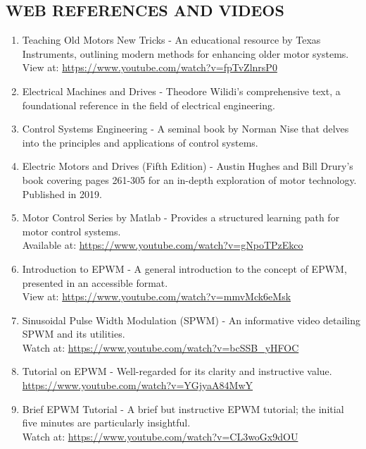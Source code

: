 \subsection*{WEB REFERENCES AND VIDEOS}



\begin{enumerate}
    \item Teaching Old Motors New Tricks - An educational resource by Texas Instruments, outlining modern methods for enhancing older motor systems.\\
    View at: \url{https://www.youtube.com/watch?v=fpTvZlnrsP0}
    
    \item Electrical Machines and Drives - Theodore Wilidi's comprehensive text, a foundational reference in the field of electrical engineering.
    
    \item Control Systems Engineering - A seminal book by Norman Nise that delves into the principles and applications of control systems.
    
    \item Electric Motors and Drives (Fifth Edition) - Austin Hughes and Bill Drury’s book covering pages 261-305 for an in-depth exploration of motor technology. Published in 2019.
    
    \item Motor Control Series by Matlab - Provides a structured learning path for motor control systems.\\
    Available at: \url{https://www.youtube.com/watch?v=gNpoTPzEkco}
    

    \item Introduction to EPWM - A general introduction to the concept of EPWM, presented in an accessible format.\\
    View at: \url{https://www.youtube.com/watch?v=mmvMck6eMsk}
    
    \item Sinusoidal Pulse Width Modulation (SPWM) - An informative video detailing SPWM and its utilities.\\
    Watch at: \url{https://www.youtube.com/watch?v=bcSSB_yHFOC}
    
    \item Tutorial on EPWM - Well-regarded for its clarity and instructive value.\\
    \url{https://www.youtube.com/watch?v=YGjyaA84MwY}
    
    \item Brief EPWM Tutorial - A brief but instructive EPWM tutorial; the initial five minutes are particularly insightful.\\
    Watch at: \url{https://www.youtube.com/watch?v=CL3woGx9dOU}
    

\end{enumerate}
